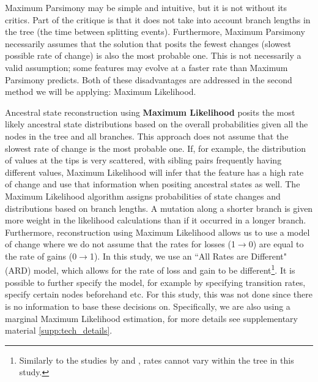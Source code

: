 \documentclass[12pt,letterpaper]{article}
\begin{document}
Maximum Parsimony may be simple and intuitive, but it is not without its critics. Part of the critique is that it does not take into account branch lengths in the tree (the time between splitting events). Furthermore, Maximum Parsimony necessarily assumes that the solution that posits the fewest changes (slowest possible rate of change) is also the most probable one. This is not necessarily a valid assumption; some features may evolve at a faster rate than Maximum Parsimony predicts. Both of these disadvantages are addressed in the second method we will be applying: Maximum Likelihood.

Ancestral state reconstruction using \textbf{Maximum Likelihood} posits the most likely ancestral state distributions based on the overall probabilities given all the nodes in the tree and all branches. This approach does not assume that the slowest rate of change is the most probable one. If, for example, the distribution of values at the tips is very scattered, with sibling pairs frequently having different values, Maximum Likelihood will infer that the feature has a high rate of change and use that information when positing ancestral states as well. The Maximum Likelihood algorithm assigns probabilities of state changes and distributions based on branch lengths. A mutation along a shorter branch is given more weight in the likelihood calculations than if it occurred in a longer branch. Furthermore, reconstruction using Maximum Likelihood allows us to use a model of change where we do not assume that the rates for losses (1$\rightarrow$0) are equal to the rate of gains (0$\rightarrow$1). In this study, we use an ``All Rates are Different" (ARD) model, which allows for the rate of loss and gain to be different\footnote{Similarly to the studies by \citet{carling2021reconstructing} and \citet{goldstein_2022}, rates cannot vary within the tree in this study.}. It is possible to further specify the model, for example by specifying transition rates, specify certain nodes beforehand etc. For this study, this was not done since there is no information to base these decisions on. Specifically, we are also using a marginal Maximum Likelihood estimation, for more details see supplementary material \ref{supp:tech_details}.
\end{document}
